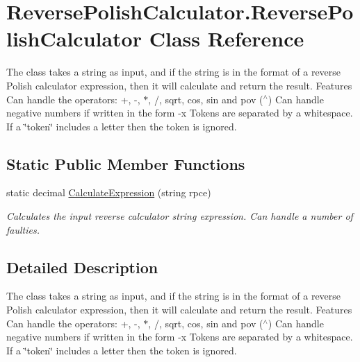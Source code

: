 \hypertarget{class_reverse_polish_calculator_1_1_reverse_polish_calculator}{\section{Reverse\+Polish\+Calculator.\+Reverse\+Polish\+Calculator Class Reference}
\label{class_reverse_polish_calculator_1_1_reverse_polish_calculator}
}


The class takes a string as input, and if the string is in the format of a reverse Polish calculator expression, then it will calculate and return the result. Features Can handle the operators\+: +, -\/, $\ast$, /, sqrt, cos, sin and pov ($^\wedge$) Can handle negative numbers if written in the form -\/x Tokens are separated by a whitespace. If a \char`\"{}token\char`\"{} includes a letter then the token is ignored.  


\subsection*{Static Public Member Functions}
\begin{DoxyCompactItemize}
\item 
static decimal \hyperlink{class_reverse_polish_calculator_1_1_reverse_polish_calculator_ad72f2197711f4a68d2f7fce26e22b533}{Calculate\+Expression} (string rpce)
\begin{DoxyCompactList}\small\item\em Calculates the input reverse calculator string expression. Can handle a number of faulties. \end{DoxyCompactList}\end{DoxyCompactItemize}


\subsection{Detailed Description}
The class takes a string as input, and if the string is in the format of a reverse Polish calculator expression, then it will calculate and return the result. Features Can handle the operators\+: +, -\/, $\ast$, /, sqrt, cos, sin and pov ($^\wedge$) Can handle negative numbers if written in the form -\/x Tokens are separated by a whitespace. If a \char`\"{}token\char`\"{} includes a letter then the token is ignored. 



